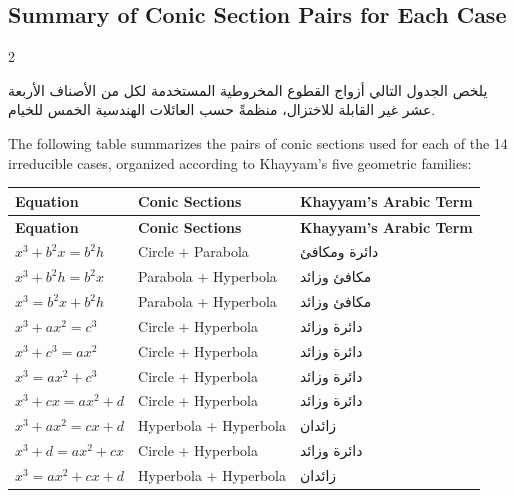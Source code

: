 \documentclass[11pt,a4paper]{book}
\begin{document}
\subsection{Summary of Conic Section Pairs for Each Case}
\label{subsec:summary}

\begin{paracol}{2}

\begin{Arabic}
يلخص الجدول التالي أزواج القطوع المخروطية المستخدمة لكل من الأصناف الأربعة عشر غير القابلة للاختزال، منظمةً حسب العائلات الهندسية الخمس للخيام.
\end{Arabic}

\switchcolumn

The following table summarizes the pairs of conic sections used for each of the 14 irreducible cases, organized according to Khayyam's five geometric families:

\end{paracol}

\begin{center}
\renewcommand{\arraystretch}{1.4}
\begin{longtable}{p{5.5cm}p{3.5cm}p{4cm}}
\toprule
\textbf{Equation} & \textbf{Conic Sections} & \textbf{Khayyam's Arabic Term} \\
\midrule\endfirsthead
\toprule
\textbf{Equation} & \textbf{Conic Sections} & \textbf{Khayyam's Arabic Term} \\
\midrule\endhead
\bottomrule\endfoot
$x^3 + b^2 x = b^2 h$ & Circle + Parabola & \textarabic{دائرة ومكافئ} \\
$x^3 + b^2 h = b^2 x$ & Parabola + Hyperbola & \textarabic{مكافئ وزائد} \\
$x^3 = b^2 x + b^2 h$ & Parabola + Hyperbola & \textarabic{مكافئ وزائد} \\
$x^3 + ax^2 = c^3$ & Circle + Hyperbola & \textarabic{دائرة وزائد} \\
$x^3 + c^3 = ax^2$ & Circle + Hyperbola & \textarabic{دائرة وزائد} \\
$x^3 = ax^2 + c^3$ & Circle + Hyperbola & \textarabic{دائرة وزائد} \\
$x^3 + cx = ax^2 + d$ & Circle + Hyperbola & \textarabic{دائرة وزائد} \\
$x^3 + ax^2 = cx + d$ & Hyperbola + Hyperbola & \textarabic{زائدان} \\
$x^3 + d = ax^2 + cx$ & Circle + Hyperbola & \textarabic{دائرة وزائد} \\
$x^3 = ax^2 + cx + d$ & Hyperbola + Hyperbola & \textarabic{زائدان} \\
\bottomrule
\end{longtable}
\end{center}
\end{document}
